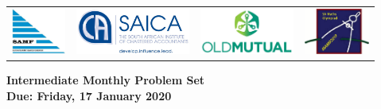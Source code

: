 \documentclass{article}
\begin{document}
\setlength{\tabcolsep}{5pt}
\begin{center} \begin{tabular}{cccc}
	\includegraphics[height=43pt]{SAMF_logo.jpg} &
	\includegraphics[height=43pt]{SAICA_logo.jpg} &
	\includegraphics[height=43pt]{OM_Logo_Stacked_Vignette_on_White_RGB.jpg} &
	\includegraphics[height=43pt]{SAMO2019.png}
\end{tabular} \end{center}

\bigskip

\begin{center}
\textbf{\Large Intermediate Monthly Problem Set}
\\ \vspace{1em}
\textbf{\large Due: Friday, 17 January 2020}
\end{center}
\end{document}
